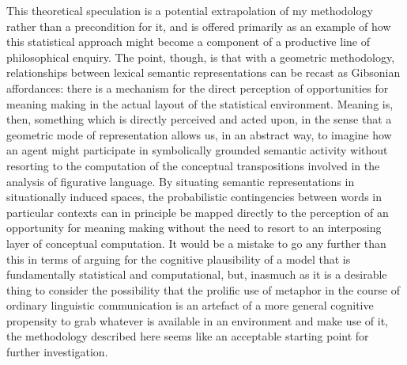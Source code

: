 This theoretical speculation is a potential extrapolation of my methodology rather than a precondition for it, and is offered primarily as an example of how this statistical approach might become a component of a productive line of philosophical enquiry.  The point, though, is that with a geometric methodology, relationships between lexical semantic representations can be recast as Gibsonian affordances: there is a mechanism for the direct perception of opportunities for meaning making in the actual layout of the statistical environment.  Meaning is, then, something which is directly perceived and acted upon, in the sense that a geometric mode of representation allows us, in an abstract way, to imagine how an agent might participate in symbolically grounded semantic activity without resorting to the computation of the conceptual transpositions involved in the analysis of figurative language.    By situating semantic representations in situationally induced spaces, the probabilistic contingencies between words in particular contexts can in principle be mapped directly to the perception of an opportunity for meaning making without the need to resort to an interposing layer of conceptual computation.  It would be a mistake to go any further than this in terms of arguing for the cognitive plausibility of a model that is fundamentally statistical and computational, but, inasmuch as it is a desirable thing to consider the possibility that the prolific use of metaphor in the course of ordinary linguistic communication is an artefact of a more general cognitive propensity to grab whatever is available in an environment and make use of it, the methodology described here seems like an acceptable starting point for further investigation.

